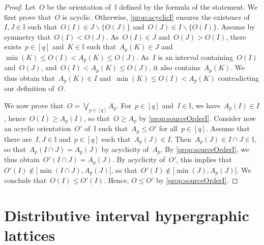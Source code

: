 \documentclass{amsart}
\theoremstyle{definition}
\newcommand{\ssm}{\smallsetminus} %
\newcommand{\bigJoin}{\bigvee} %
\newcommand{\II}{\mathbb I} %
\begin{document}
\begin{proof}
Let~$O$ be the orientation of~$\II$ defined by the formula of the statement.
We first prove that~$O$ is acyclic.
Otherwise, \cref{prop:acyclicI} ensures the existence of~$I,J \in \II$ such that~$O(I) \in J \ssm \{O(J)\}$ and~$O(J) \in I \ssm \{O(I)\}$.
Assume by symmetry that~$O(I) < O(J)$.
As~$O(I) \in J$ and~$O(J) > O(I)$, there exists~$p \in [q]$ and~$K \in \II$ such that~$A_p(K) \in J$ and~$\min(K) \le O(I) < A_p(K) \le O(J)$.
As~$I$ is an interval containing~$O(I)$ and~$O(J)$, and~$O(I) < A_p(K) \le O(J)$, it also contains~$A_p(K)$.
We thus obtain that~$A_p(K) \in I$ and~$\min(K) \le O(I) < A_p(K)$ contradicting our definition of~$O$.

We now prove that~$O = \bigJoin_{p \in [q]} A_p$.
For~$p \in [q]$ and~$I \in \II$, we have~$A_p(I) \in I$, hence~${O(I) \ge A_p(I)}$, so that~$O \ge A_p$ by \cref{prop:sourceOrderI}.
Consider now an acyclic orientation~$O'$ of~$\II$ such that~$A_p \le O'$ for all~$p \in [q]$.
Assume that there are~$I, J \in \II$ and~$p \in [q]$ such that~$A_p(J) \in I$.
Then~$A_p(J) \in I \cap J \in \II$, so that~$A_p(I \cap J) = A_p(J)$ by acyclicity of~$A_p$.
By \cref{prop:sourceOrderI}, we thus obtain~$O'(I \cap J) = A_p(J)$.
By acyclicity of~$O'$, this implies that~$O'(I) \notin {[\min(I \cap J), A_p(J)[}$, so that~$O'(I) \notin [\min(J), A_p(J)[$.
We conclude that~$O(I) \le O'(I)$.
Hence, $O \le O'$ by \cref{prop:sourceOrderI}.
\end{proof}


\section{Distributive interval hypergraphic lattices}
\label{sec:distributive}
\end{document}
